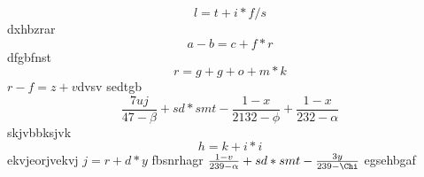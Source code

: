 $$l=t+i*f/s$$
dxhbzrar
$$a-b=c+f*r$$
dfgbfnst
\begin{equation}r=g+g+o+m*k\end{equation}
\(r-f=z+v\)dvsv
sedtgb
\begin{equation}\frac{7uj}{47 - \beta} + sd*smt -\frac{1 - x}{2132 - \phi} + \frac{1 - x}{232 - \alpha}\end{equation}
skjvbbksjvk $$h=k+i*i$$ ekvjeorjvekvj
$j=r+d*y$
fbsnrhagr
$\frac{1 - v}{239 - \alpha} + sd*smt -\frac{3y}{239 - \Chi}$
egsehbgaf